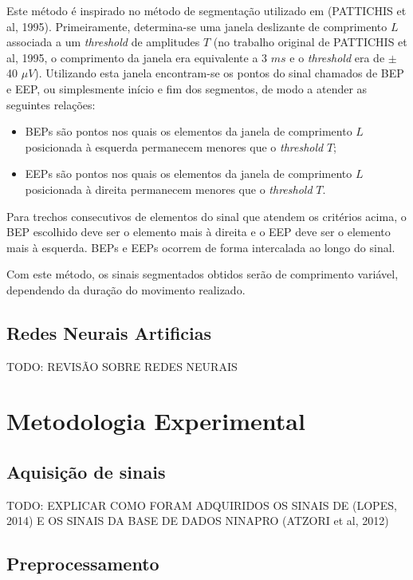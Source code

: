\documentclass[
	12pt,				%
	openright,			%
	oneside,
	a4paper,			%
	english,			%
	francais,			%
	spanish,			%
	brazil				%
	]{abntex2}
\begin{document}
	Este método é inspirado no método de segmentação utilizado em (PATTICHIS et al, 1995). Primeiramente, determina-se uma janela deslizante de comprimento $L$ associada a um \emph{threshold} de amplitudes $T$ (no trabalho original de PATTICHIS et al, 1995, o comprimento da janela era equivalente a 3 $ms$ e o \emph{threshold} era de $\pm$ 40 $\mu V$). Utilizando esta janela encontram-se os pontos do sinal chamados de BEP e EEP, ou simplesmente início e fim dos segmentos, de modo a atender as seguintes relações:

\begin{itemize}
\item{BEPs são pontos nos quais os elementos da janela de comprimento $L$ posicionada à esquerda permanecem menores que o \emph{threshold} $T$;}
\item{EEPs são pontos nos quais os elementos da janela de comprimento $L$ posicionada à direita permanecem menores que o \emph{threshold} $T$.}
\end{itemize}

	Para trechos consecutivos de elementos do sinal que atendem os critérios acima, o BEP escolhido deve ser o elemento mais à direita e o EEP deve ser o elemento mais à esquerda. BEPs e EEPs ocorrem de forma intercalada ao longo do sinal.
	
	Com este método, os sinais segmentados obtidos serão de comprimento variável, dependendo da duração do movimento realizado.
\section{Redes Neurais Artificias}

	TODO: REVISÃO SOBRE REDES NEURAIS

\chapter{Metodologia Experimental}

\section{Aquisição de sinais}

	TODO: EXPLICAR COMO FORAM ADQUIRIDOS OS SINAIS DE (LOPES, 2014) E OS SINAIS DA BASE DE DADOS NINAPRO (ATZORI et al, 2012)

\section{Preprocessamento}
\end{document}
